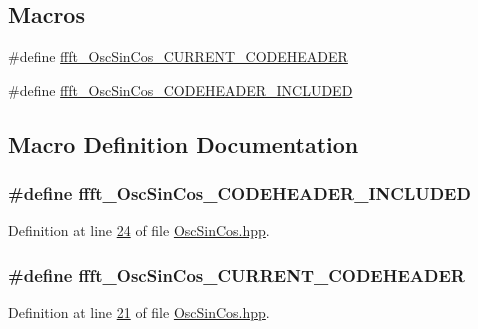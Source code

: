 \subsection*{Macros}
\begin{DoxyCompactItemize}
\item 
\#define \hyperlink{a00112_a494ff2306ae58e9421db77eb15781a51}{ffft\+\_\+\+Osc\+Sin\+Cos\+\_\+\+C\+U\+R\+R\+E\+N\+T\+\_\+\+C\+O\+D\+E\+H\+E\+A\+D\+E\+R}
\item 
\#define \hyperlink{a00112_ae01440666959e9c8b8737183e8a5b3ef}{ffft\+\_\+\+Osc\+Sin\+Cos\+\_\+\+C\+O\+D\+E\+H\+E\+A\+D\+E\+R\+\_\+\+I\+N\+C\+L\+U\+D\+E\+D}
\end{DoxyCompactItemize}


\subsection{Macro Definition Documentation}
\hypertarget{a00112_ae01440666959e9c8b8737183e8a5b3ef}{
\subsubsection[{ffft\+\_\+\+Osc\+Sin\+Cos\+\_\+\+C\+O\+D\+E\+H\+E\+A\+D\+E\+R\+\_\+\+I\+N\+C\+L\+U\+D\+E\+D}]{\setlength{\rightskip}{0pt plus 5cm}\#define ffft\+\_\+\+Osc\+Sin\+Cos\+\_\+\+C\+O\+D\+E\+H\+E\+A\+D\+E\+R\+\_\+\+I\+N\+C\+L\+U\+D\+E\+D}}\label{a00112_ae01440666959e9c8b8737183e8a5b3ef}


Definition at line \hyperlink{a00112_source_l00024}{24} of file \hyperlink{a00112_source}{Osc\+Sin\+Cos.\+hpp}.

\hypertarget{a00112_a494ff2306ae58e9421db77eb15781a51}{
\subsubsection[{ffft\+\_\+\+Osc\+Sin\+Cos\+\_\+\+C\+U\+R\+R\+E\+N\+T\+\_\+\+C\+O\+D\+E\+H\+E\+A\+D\+E\+R}]{\setlength{\rightskip}{0pt plus 5cm}\#define ffft\+\_\+\+Osc\+Sin\+Cos\+\_\+\+C\+U\+R\+R\+E\+N\+T\+\_\+\+C\+O\+D\+E\+H\+E\+A\+D\+E\+R}}\label{a00112_a494ff2306ae58e9421db77eb15781a51}


Definition at line \hyperlink{a00112_source_l00021}{21} of file \hyperlink{a00112_source}{Osc\+Sin\+Cos.\+hpp}.

